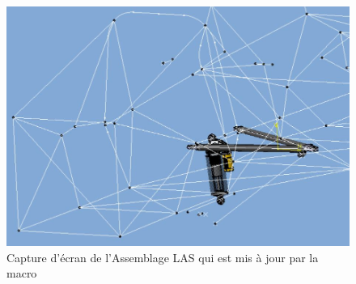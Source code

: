 \begin{figure}[H]
    \centering
    \includegraphics[width=0.8\linewidth]{img/capture_LAS.JPG}
    \caption{Capture d'écran de l'Assemblage LAS qui est mis à jour par la macro}
    \label{fig:assemblage_las}
\end{figure}